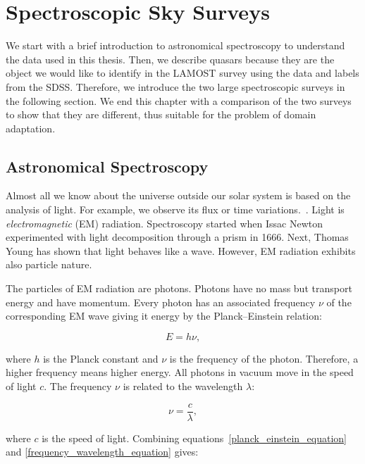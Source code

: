 \chapter{Spectroscopic Sky Surveys}
\label{data_chapter}

We start with a brief introduction to astronomical spectroscopy to understand the data used in this thesis.
Then, we describe quasars because they are the object we would like to identify in the LAMOST survey using the data and labels from the SDSS.
Therefore, we introduce the two large spectroscopic surveys in the following section.
We end this chapter with a comparison of the two surveys to show
that they are different, thus suitable for the problem of domain adaptation.

\section{Astronomical Spectroscopy}

Almost all we know about the universe outside our solar system is based on the analysis of light.
For example, we observe its flux or time variations.~\cite{appenzeller2012}.
Light is \textit{electromagnetic} (EM) radiation.
Spectroscopy started when Issac Newton experimented with light decomposition through a prism in 1666.
Next, Thomas Young has shown that light behaves like a wave.
However, EM radiation exhibits also particle nature.

The particles of EM radiation are photons.
Photons have no mass but transport energy and have momentum.
Every photon has an associated frequency \(\nu\) of the corresponding EM wave
giving it energy by the Planck--Einstein relation:

\begin{equation}
	E = h \nu,
	\label{planck_einstein_equation}
\end{equation}

where \(h\) is the Planck constant and \(\nu\) is the frequency of the photon.
Therefore, a higher frequency means higher energy.
All photons in vacuum move in the speed of light \(c\).
The frequency \(\nu\) is related to the wavelength \(\lambda\):

\begin{equation}
	\nu = \frac{c}{\lambda},
	\label{frequency_wavelength_equation}
\end{equation}

where \(c\) is the speed of light.
Combining equations~\ref{planck_einstein_equation} and \ref{frequency_wavelength_equation} gives:

